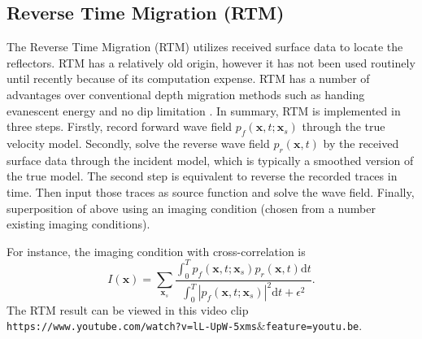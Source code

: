 \documentclass[12pt]{article}
\newcommand{\bx}{\boldsymbol{x}}
\theoremstyle{plain}
\theoremstyle{definition}
\theoremstyle{remark}
\numberwithin{equation}{section}
\begin{document}
\subsection{Reverse Time Migration (RTM)}
The Reverse Time Migration (RTM) utilizes received surface data to locate the reflectors. 
RTM has a relatively old origin, however it has not been used routinely until recently because of its
computation expense. RTM has a number of advantages over conventional depth migration methods such as 
handing evanescent energy and no dip limitation \cite{Mcm1983, BayKosAO1983}. In summary, RTM is implemented in three steps. Firstly, 
record forward wave field $p_f(\bx, t; \bx_s)$ through the true velocity model. Secondly, solve the reverse wave field $p_r(\bx, t)$ by the received surface data through the incident model, which is typically a smoothed version of the true model. The second step is equivalent to reverse the recorded traces in time. Then input those traces as source function and solve the wave field. Finally, superposition of above using an imaging condition (chosen from a number existing imaging conditions).

For instance, the imaging condition with cross-correlation is 
\begin{equation}
I(\bx) = \sum_{\bx_s} \frac{\int_0^T p_f(\bx, t; \bx_s)p_r(\bx, t)\mathrm{d}t}{\int_0^T |p_f(\bx, t; \bx_s)|^2\mathrm{d}t + \epsilon^2}.
\end{equation}
The RTM result can be viewed in this video clip
\texttt{https://www.youtube.com/watch?v=lL-UpW-5xms$\&$feature=youtu.be}.
\end{document}
